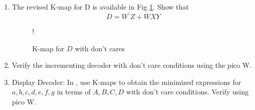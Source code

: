\begin{enumerate}[label=\arabic*.,ref=\theenumi]
%
\item  The revised K-map for D is available in Fig \ref{fig:kmap_D_x}.  Show that 
%
\begin{equation}
D  = {W}^{\prime}{Z} + {W}{X}{Y}
\end{equation}
\begin{figure}[H]
	\centering
\resizebox {0.5\columnwidth} {!} {

}
\caption{K-map for $D$ with don't cares}
\label{fig:kmap_D_x}
\end{figure}
%
\item 
	Verify the incrementing decoder with don't care conditions using the pico W.
\item {Display Decoder:}
In ,
use K-maps to obtain the minimized expressions for $a,b,c,d,e,f,g$ in terms of $A,B,C,D$ with  don't care conditions.  Verify using pico W.
\end{enumerate}




